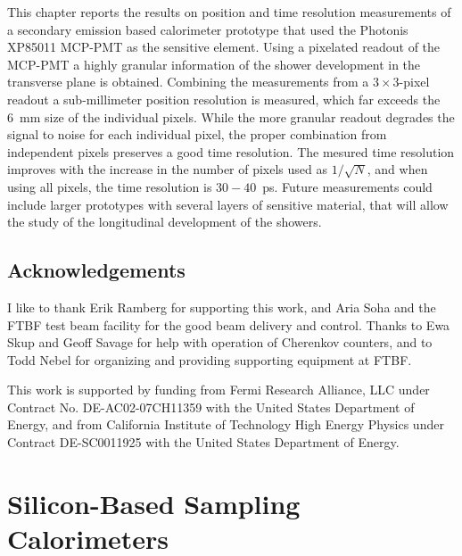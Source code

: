 This chapter reports the results on position and time resolution measurements of a
secondary emission based calorimeter prototype that used the Photonis XP85011
MCP-PMT as the sensitive element. Using a pixelated readout of the MCP-PMT a
highly granular information of the shower development in the
transverse plane is obtained. Combining the measurements from a
$3\times3$-pixel readout a sub-millimeter position resolution is
measured, which far exceeds the 6~mm size of the individual pixels. While the more granular readout degrades
the signal to noise for each individual pixel, the proper combination from 
independent pixels preserves a good time resolution. The mesured time resolution improves with the increase in the number of pixels used as 
$1/\sqrt{N}$, and when using all pixels, the time resolution is $30-40$~ps. 
Future measurements could include larger prototypes with several layers of sensitive
material, that will allow the study of the longitudinal development of the
showers.

\section{Acknowledgements}
I like to thank Erik Ramberg for supporting 
this work, and Aria Soha and the FTBF test beam facility for the good beam
delivery and control. Thanks to Ewa Skup and Geoff Savage for help with
operation of Cherenkov counters, and to Todd Nebel for organizing and providing
supporting equipment at FTBF. 

This work is supported by funding from Fermi Research Alliance, LLC under
Contract No. DE-AC02-07CH11359 with the United States Department of Energy, and
from California Institute of Technology High Energy Physics under Contract
DE-SC0011925 with the United States Department of Energy.

\clearpage
\chapter{Silicon-Based Sampling Calorimeters}\label{sil-cal}

